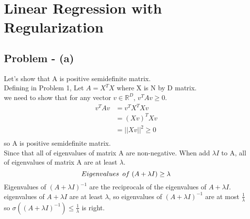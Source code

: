 \documentclass{article}
\begin{document}
\section{Linear Regression with Regularization}
\subsection{Problem - (a)}
Let's show that A is positive semidefinite matrix. \\
Defining in Problem 1, Let $A=X^{T}X$ where X is N by D matrix. \\
we need to show that for any vector $v \in \mathbb{R}^{D}$, $v^{T}Av \geq 0$. \\
\[
\begin{aligned}
    v^{T}Av &= v^{T}X^{T}Xv \\
    &= (Xv)^{T}Xv \\
    &= ||Xv||^{2} \geq 0 \\
\end{aligned}
\]
so A is positive semidefinite matrix. \\
Since that all of eigenvalues of matrix A are non-negative. When add $\lambda I$ to A, all of eigenvalues of matrix A are at least $\lambda$. \\
\[
Eigenvalues \hspace{0.5em} of \hspace{0.3em} (A+\lambda I) \geq \lambda
\]
Eigenvalues of $(A+\lambda I)^{-1}$ are the reciprocals of the eigenvalues of $A+\lambda I$. \\
eigenvalues of $A+\lambda I$ are at least $\lambda$, so eigenvalues of $(A+\lambda I)^{-1}$ are at most $\frac{1}{\lambda}$ \\
so $\sigma((A+\lambda I)^{-1}) \leq \frac{1}{\lambda}$ is right. \\
\end{document}
